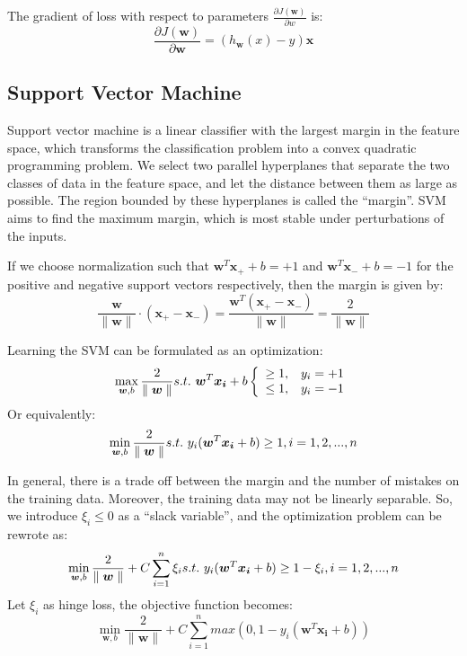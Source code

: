 \documentclass[journal, a4paper]{IEEEtran}
\begin{document}
The gradient of loss with respect to parameters $\frac{\partial J(\bm{w})}{\partial w}$ is:
\begin{equation}
\frac{\partial J(\bm{w})}{\partial \bm{w}} = (h_{\bm{w}}(x)-y)\bm{x}
\end{equation}

\subsection{Support Vector Machine}
Support vector machine is a linear classifier with the largest margin in the feature space, which transforms the classification problem into a convex quadratic programming problem. We select two parallel hyperplanes that separate the two classes of data in the feature space, and let the distance between them as large as possible. The region bounded by these hyperplanes is called the ``margin''. SVM aims to find the maximum margin, which is most stable under perturbations of the inputs.

If we choose normalization such that $\bm{w}^{T}\bm{x}_{+} + b = +1$ and $\bm{w}^{T}\bm{x}_{-} + b = -1$ for the positive and negative support vectors respectively, then the margin is given by:
\begin{equation}
  \frac{\bm{w}}{\parallel \bm{w} \parallel}\cdot(\bm{x}_{+}-\bm{x}_{-}) = \frac{\bm{w}^{T}(\bm{x}_{+}-\bm{x}_{-})}{\parallel \bm{w} \parallel} = \frac{2}{\parallel \bm{w} \parallel}
\end{equation}

Learning the SVM can be formulated as an optimization:
\begin{equation}
\max\limits_{\bm{w},b}\frac{2}{\parallel \bm{w} \parallel} \\
s.t.\ \bm{w}^T\bm{x_i}+b
\left\{
             \begin{array}{lr}
             \ge 1, &  y_i = +1\\
             \le 1, & y_i = -1\\
             \end{array}
\right.
\end{equation}
Or equivalently:
\begin{equation}
\min\limits_{\bm{w},b}\frac{2}{\parallel \bm{w} \parallel} \\
s.t.\ y_i(\bm{w}^T\bm{x_i}+b)\ge1, i=1,2,...,n
\end{equation}

In general, there is a trade off between the margin and the number of mistakes on the training data. Moreover, the training data may not be linearly separable. So, we introduce $\xi_i \le 0$ as a ``slack variable'', and the optimization problem can be rewrote as:
\begin{equation}
\min\limits_{\bm{w},b}\frac{2}{\parallel \bm{w} \parallel}+C\sum_{i=1}^{n}\xi_i \\
s.t.\ y_i(\bm{w}^T\bm{x_i}+b)\ge1-\xi_i, i=1,2,...,n
\end{equation}
Let $\xi_i$ as hinge loss, the objective function becomes:
\begin{equation}
\min\limits_{\bm{w},b}\frac{2}{\parallel \bm{w} \parallel}+C\sum_{i=1}^{n}max(0,1-y_i(\bm{w}^T\bm{x_i}+b))
\end{equation}
\end{document}
